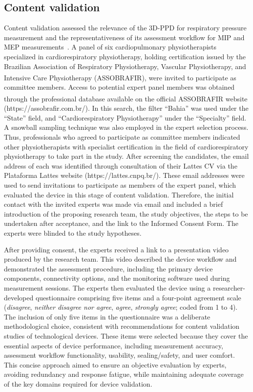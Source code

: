 \documentclass{ieeeaccess}
\begin{document}
\subsection{Content validation}

Content validation assessed the relevance of the 3D-PPD for respiratory pressure measurement and the representativeness of its assessment workflow for MIP and MEP measurements~\cite{Souza2017,Yusoff2019}. A panel of six cardiopulmonary physiotherapists {specialized in cardiorespiratory physiotherapy, holding certification issued by the Brazilian Association of Respiratory Physiotherapy, Vascular Physiotherapy, and Intensive Care Physiotherapy (ASSOBRAFIR\textsuperscript{\textregistered}), were invited to participate as committee members. Access to potential expert panel members was obtained through the professional database available on the official ASSOBRAFIR\textsuperscript{\textregistered} website (https://assobrafir.com.br/). In this search, the filter “Bahia” was used under the “State” field, and ``Cardiorespiratory Physiotherapy'' under the ``Specialty'' field. A snowball sampling technique was also employed in the expert selection process. Thus, professionals who agreed to participate as committee members indicated other physiotherapists with specialist certification in the field of cardiorespiratory physiotherapy to take part in the study. After screening the candidates, the email address of each was identified through consultation of their Lattes CV via the Plataforma Lattes website (https://lattes.cnpq.br/). These email addresses were used to send invitations to participate as members of the expert panel, which evaluated the device in this stage of content validation. Therefore, the initial contact with the invited experts was made via email and included a brief introduction of the proposing research team, the study objectives, the steps to be undertaken after acceptance, and the link to the Informed Consent Form. The experts were blinded to the study hypotheses.}

After providing consent, the experts received a link to a presentation video produced by the research team. This video described the device workflow and demonstrated the assessment procedure, including the primary device components, connectivity options, and the monitoring software used during measurement sessions. The experts then evaluated the device using a researcher-developed questionnaire comprising five items and a four-point agreement scale (\emph{disagree}, \emph{neither disagree nor agree}, \emph{agree}, \emph{strongly agree}; coded from 1 to 4). {The inclusion of only five items in the questionnaire was a deliberate methodological choice, consistent with recommendations for content validation studies of technological devices. These items were selected because they cover the essential aspects of device performance, including measurement accuracy, assessment workflow functionality, usability, sealing/safety, and user comfort. This concise approach aimed to ensure an objective evaluation by experts, avoiding redundancy and response fatigue, while maintaining adequate coverage of the key domains required for device validation.} 
\end{document}
